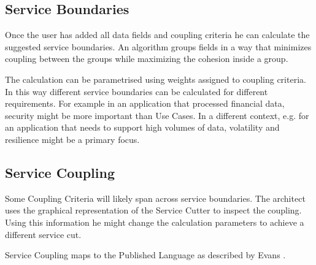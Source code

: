 \subsection{Service Boundaries}

Once the user has added all data fields and coupling criteria he can calculate the suggested service boundaries. An algorithm groups fields in a way that minimizes coupling between the groups while maximizing the cohesion inside a group.

The calculation can be parametrised using weights assigned to coupling criteria. In this way different service boundaries can be calculated for different requirements. For example in an application that processed financial data, security might be more important than Use Cases. In a different context, e.g. for an application that needs to support high volumes of data, volatility and resilience might be a primary focus.

\subsection{Service Coupling}

Some Coupling Criteria will likely span across service boundaries. The architect uses the graphical representation of the Service Cutter to inspect the coupling. Using this information he might change the calculation parameters to achieve a different service cut.

Service Coupling maps to the Published Language as described by Evans \cite[p.375]{evans2003domain}.

